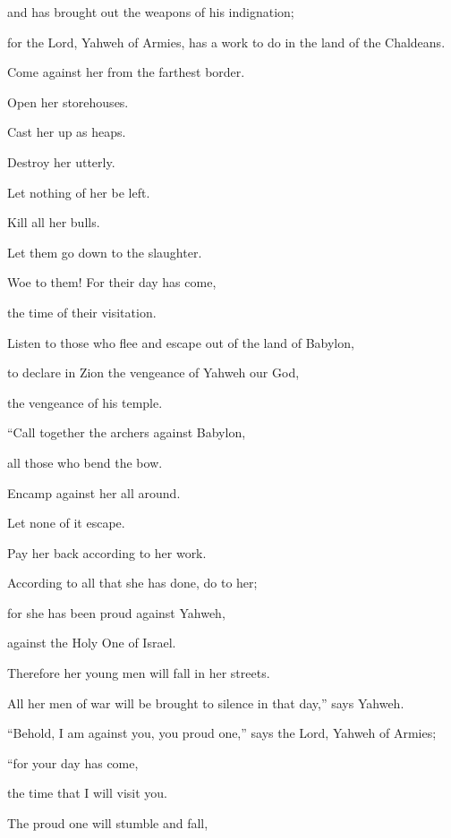{\par }{\QB and has brought out the weapons of his indignation;
\par }{\QB for the Lord, Yahweh of Armies, has a work to do in the land of the Chaldeans.
\par }{\Q {}Come against her from the farthest border.
\par }{\QB Open her storehouses.
\par }{\QB Cast her up as heaps.
\par }{\Q Destroy her utterly.
\par }{\QB Let nothing of her be left.
\par }{\Q {}Kill all her bulls.
\par }{\QB Let them go down to the slaughter.
\par }{\Q Woe to them! For their day has come,
\par }{\QB the time of their visitation.
\par }{\Q {}Listen to those who flee and escape out of the land of Babylon,
\par }{\QB to declare in Zion the vengeance of Yahweh our God,
\par }{\QB the vengeance of his temple.
\par }{\BB \par }{\Q {}“Call together the archers against Babylon,
\par }{\QB all those who bend the bow.
\par }{\Q Encamp against her all around.
\par }{\QB Let none of it escape.
\par }{\Q Pay her back according to her work.
\par }{\QB According to all that she has done, do to her;
\par }{\Q for she has been proud against Yahweh,
\par }{\QB against the Holy One of Israel.
\par }{\Q {}Therefore her young men will fall in her streets.
\par }{\QB All her men of war will be brought to silence in that day,” says Yahweh.
\par }{\Q {}“Behold, I am against you, you proud one,” says the Lord, Yahweh of Armies;
\par }{\QB “for your day has come,
\par }{\QB the time that I will visit you.
\par }{\Q {}The proud one will stumble and fall,
}
